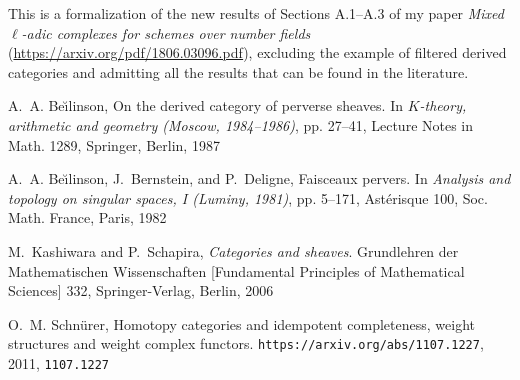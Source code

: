 %

This is a formalization of the new results of Sections A.1--A.3 of my paper 
\emph{Mixed $\ell$-adic complexes for schemes over number fields}
(\url{https://arxiv.org/pdf/1806.03096.pdf}), excluding
the example of filtered derived categories and admitting
all the results that can be found in the literature.

\tableofcontents





\def\cprime{$'$}
\begin{thebibliography}{10}
\providecommand{\url}[1]{\texttt{#1}}
\providecommand{\urlprefix}{URL }
\providecommand{\eprint}[2][]{\url{#2}}

A.~A. Be{\u\i}linson, On the derived category of perverse sheaves. In
  \emph{{$K$}-theory, arithmetic and geometry ({M}oscow, 1984--1986)}, pp.
  27--41, Lecture Notes in Math. 1289, Springer, Berlin, 1987 

A.~A. Be{\u\i}linson, J.~Bernstein, and P.~Deligne, Faisceaux pervers. In
  \emph{Analysis and topology on singular spaces, {I} ({L}uminy, 1981)}, pp.
  5--171, Ast\'erisque 100, Soc. Math. France, Paris, 1982

M.~Kashiwara and P.~Schapira, \emph{Categories and sheaves}. Grundlehren der
  Mathematischen Wissenschaften [Fundamental Principles of Mathematical
  Sciences] 332, Springer-Verlag, Berlin, 2006


O.~M. Schnürer, Homotopy categories and idempotent completeness, weight
  structures and weight complex functors.
  \url{https://arxiv.org/abs/1107.1227}, 2011, \eprint{1107.1227}

\end{thebibliography}